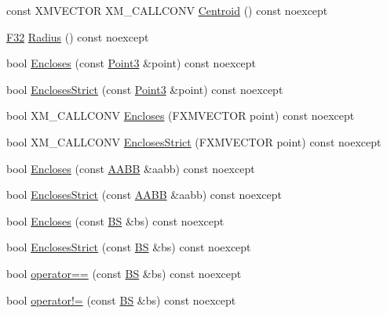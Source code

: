 \begin{DoxyCompactItemize}
\item 
const X\+M\+V\+E\+C\+T\+OR X\+M\+\_\+\+C\+A\+L\+L\+C\+O\+NV \hyperlink{classmage_1_1_b_s_acd3a412603c22365a3892a6aae8c52bc}{Centroid} () const noexcept
\item 
\hyperlink{namespacemage_aa97e833b45f06d60a0a9c4fc22ae02c0}{F32} \hyperlink{classmage_1_1_b_s_a2814e5d5ad569bfcbf08f368cd23dbea}{Radius} () const noexcept
\item 
bool \hyperlink{classmage_1_1_b_s_a0050f2e110b107ae98bb9f33e3386758}{Encloses} (const \hyperlink{structmage_1_1_point3}{Point3} \&point) const noexcept
\item 
bool \hyperlink{classmage_1_1_b_s_adcbd276fc5ecb48367b83da5a42defd4}{Encloses\+Strict} (const \hyperlink{structmage_1_1_point3}{Point3} \&point) const noexcept
\item 
bool X\+M\+\_\+\+C\+A\+L\+L\+C\+O\+NV \hyperlink{classmage_1_1_b_s_ac19027d3c6e70b0bd626f579434dbcf2}{Encloses} (F\+X\+M\+V\+E\+C\+T\+OR point) const noexcept
\item 
bool X\+M\+\_\+\+C\+A\+L\+L\+C\+O\+NV \hyperlink{classmage_1_1_b_s_adc21b04ca192c599c16e0fb49e598342}{Encloses\+Strict} (F\+X\+M\+V\+E\+C\+T\+OR point) const noexcept
\item 
bool \hyperlink{classmage_1_1_b_s_ac646d715cc59c4ac7c324696fbf00ba8}{Encloses} (const \hyperlink{classmage_1_1_a_a_b_b}{A\+A\+BB} \&aabb) const noexcept
\item 
bool \hyperlink{classmage_1_1_b_s_a5172470cadb43af2015e351ab6d4e8b6}{Encloses\+Strict} (const \hyperlink{classmage_1_1_a_a_b_b}{A\+A\+BB} \&aabb) const noexcept
\item 
bool \hyperlink{classmage_1_1_b_s_a31ae3c4759efcdf7e101cae3a702dc00}{Encloses} (const \hyperlink{classmage_1_1_b_s}{BS} \&bs) const noexcept
\item 
bool \hyperlink{classmage_1_1_b_s_ab0692e25e9cfe45eb3c6003f5fc8de9f}{Encloses\+Strict} (const \hyperlink{classmage_1_1_b_s}{BS} \&bs) const noexcept
\item 
bool \hyperlink{classmage_1_1_b_s_a5824712c541644eb0b60335957c23463}{operator==} (const \hyperlink{classmage_1_1_b_s}{BS} \&bs) const noexcept
\item 
bool \hyperlink{classmage_1_1_b_s_aa20fad8f3b8d74b8835e88bd9bda7e78}{operator!=} (const \hyperlink{classmage_1_1_b_s}{BS} \&bs) const noexcept
\end{DoxyCompactItemize}
